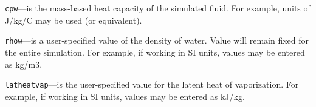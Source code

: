 \begin{description}
\item \texttt{cpw}---is the mass-based heat capacity of the simulated fluid. For example, units of J/kg/C may be used (or equivalent).

\item \texttt{rhow}---is a user-specified value of the density of water. Value will remain fixed for the entire simulation.  For example, if working in SI units, values may be entered as kg/m3.

\item \texttt{latheatvap}---is the user-specified value for the latent heat of vaporization. For example, if working in SI units, values may be entered as kJ/kg.

\end{description}

